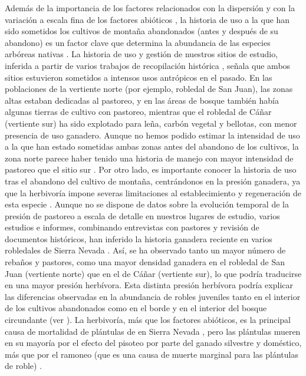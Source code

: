 Además de la importancia de los factores relacionados con la dispersión y con la variación a escala fina de los factores abióticos \autocite{Milderetal2013ColonizationPatterns,Leverkusetal2016ShiftingDemographic}, 
la historia de uso a la que han sido sometidos los cultivos de montaña abandonados (antes y después de su abandono) es un factor clave que determina la abundancia de las especies arbóreas nativas \autocites{HermyVerheyen2007LegaciesPresentday,NavarroGonzalezetal2013WeightLanduse,AlvarezMartinezetal2014InfluenceLand,Perringetal2016GlobalEnvironmental}. La historia de uso y gestión de nuestros sitios de estudio, inferida a partir de varios trabajos de recopilación histórica \autocites{MorenoLlorcaetal2014CaracterizacionFuentes, Titos1990, PerezLuqueetal2020LanduseLegacies,MorenoLlorcaetal2016HistoricalAnalysis,MesaTorres2009,JimenezOlivenciaetal2015EvolucionUsos}, señala que ambos sitios estuvieron sometidos a intensos usos antrópicos en el pasado. En las poblaciones de la vertiente norte (por ejemplo, robledal de San Juan), las zonas altas estaban dedicadas al pastoreo, y en las áreas de bosque también había algunas tierras de cultivo con pastoreo, mientras que el robledal de Cáñar (vertiente sur) ha sido explotado para leña, carbón vegetal y bellotas, con menor presencia de uso ganadero. Aunque no hemos podido estimar la intensidad de uso a la que han estado sometidas ambas zonas antes del abandono de los cultivos, la zona norte parece haber tenido una historia de manejo con mayor intensidad de pastoreo que el sitio sur \autocite{MorenoLlorcaetal2016HistoricalAnalysis, MorenoLlorcaetal2014CaracterizacionFuentes,MorenoLlorcaZamora2012CaracterizacionCarga}. Por otro lado, es importante conocer la historia de uso tras el abandono del cultivo de montaña, centrándonos en la presión ganadera, ya que la herbivoría impone severas limitaciones al establecimiento y regeneración de esta especie \autocites{Gomez2003ImpactVertebrate, Pereaetal2014InteraccionesPlantaanimal}. Aunque no se dispone de datos sobre la evolución temporal de la presión de pastoreo a escala de detalle en nuestros lugares de estudio, varios estudios e informes, combinando entrevistas con pastores y revisión de documentos históricos, han inferido la historia ganadera reciente en varios robledales de Sierra Nevada \autocites{MorenoLlorcaetal2016HistoricalAnalysis, MorenoLlorcaetal2014CaracterizacionFuentes,MorenoLlorcaZamora2012CaracterizacionCarga}. Así, se ha observado tanto un mayor número de rebaños y pastores, como una mayor densidad ganadera en el robledal de San Juan (vertiente norte) que en el de Cáñar (vertiente sur), lo que podría traducirse en una mayor presión herbívora. Esta distinta presión herbívora podría explicar las diferencias observadas en la abundancia de robles juveniles tanto en el interior de los cultivos abandonados como en el borde y en el interior del bosque circundante (ver  ). La herbivoría, más que los factores abióticos, es la principal causa de mortalidad de plántulas de \Qp en Sierra Nevada \autocite{Gomez2003ImpactVertebrate}, pero las plántulas mueren en su mayoría por el efecto del pisoteo por parte del ganado silvestre y doméstico, más que por el ramoneo (que es una causa de muerte marginal para las plántulas de roble) \autocite{Gomez2003ImpactVertebrate}. 

